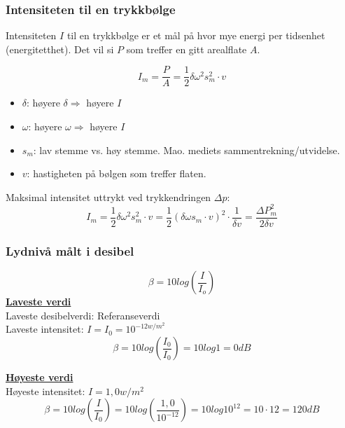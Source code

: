 \documentclass[12pt]{article}
\begin{document}
\subsubsection{Intensiteten til en trykkbølge}
Intensiteten $I$ til en trykkbølge er et mål på hvor mye energi per tidsenhet (energitetthet). Det vil si $P$ som treffer en gitt arealflate $A$.

$$I_m = \frac{P}{A} = \frac{1}{2}\delta\omega^2s_m^2\cdot v$$
\begin{itemize}
    \item [] $\delta$: høyere $\delta \Rightarrow$ høyere $I$ 
    \item [] $\omega$: høyere $\omega \Rightarrow$ høyere $I$ 
    \item [] $s_m$: lav stemme vs. høy stemme. Mao. mediets sammentrekning/utvidelse. 
    \item [] $v$: hastigheten på bølgen som treffer flaten.
\end{itemize}
Maksimal intensitet uttrykt ved trykkendringen $\Delta p$:
$$I_m = \frac{1}{2}\delta\omega^2s_m^2\cdot v = \frac{1}{2}(\delta\omega s_m\cdot v)^2\cdot\frac{1}{\delta v} = \frac{\Delta P_m^2}{2\delta v}$$

\subsubsection{Lydnivå målt i desibel}
$$\beta = 10 log(\frac{I}{I_o})$$
\underline{\textbf{Laveste verdi}}\\
\bigskip
Laveste desibelverdi: Referanseverdi\\
Laveste intensitet: $I = I_0 = 10^{-12 w/m^2}$
$$\beta = 10 log(\frac{I_0}{I_0}) = 10 log 1 = 0dB$$

\underline{\textbf{Høyeste verdi}}\\
\bigskip
Høyeste intensitet: $I = 1,0 w/m^2$
$$\beta = 10 log(\frac{I}{I_0}) = 10 log(\frac{1,0}{10^{-12}}) = 10 log 10^{12} = 10\cdot 12 = 120dB$$
\end{document}
